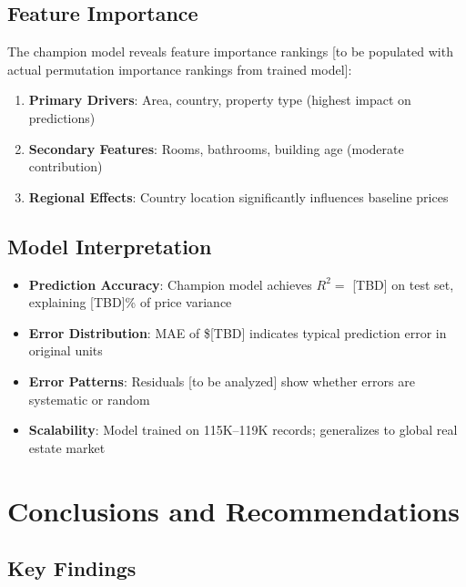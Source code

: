 \documentclass[12pt,a4paper]{article}
\begin{document}
\subsection{Feature Importance}

The champion model reveals feature importance rankings [to be populated with actual permutation importance rankings from trained model]:

\begin{enumerate}
    \item \textbf{Primary Drivers}: Area, country, property type (highest impact on predictions)
    \item \textbf{Secondary Features}: Rooms, bathrooms, building age (moderate contribution)
    \item \textbf{Regional Effects}: Country location significantly influences baseline prices
\end{enumerate}

\subsection{Model Interpretation}

\begin{itemize}
    \item \textbf{Prediction Accuracy}: Champion model achieves $R^2 = $ [TBD] on test set, explaining [TBD]\% of price variance
    \item \textbf{Error Distribution}: MAE of \$[TBD] indicates typical prediction error in original units
    \item \textbf{Error Patterns}: Residuals [to be analyzed] show whether errors are systematic or random
    \item \textbf{Scalability}: Model trained on 115K--119K records; generalizes to global real estate market
\end{itemize}

\section{Conclusions and Recommendations}

\subsection{Key Findings}
\end{document}
